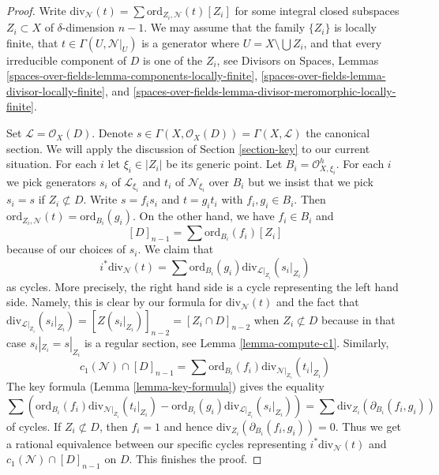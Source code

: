 \begin{proof}
Write $\text{div}_\mathcal{N}(t) = \sum \text{ord}_{Z_i, \mathcal{N}}(t)[Z_i]$
for some integral closed subspaces $Z_i \subset X$ of $\delta$-dimension
$n - 1$. We may assume that the family $\{Z_i\}$ is locally
finite, that $t \in \Gamma(U, \mathcal{N}|_U)$ is a generator
where $U = X \setminus \bigcup Z_i$, and that every irreducible component
of $D$ is one of the $Z_i$, see
Divisors on Spaces, Lemmas
\ref{spaces-over-fields-lemma-components-locally-finite},
\ref{spaces-over-fields-lemma-divisor-locally-finite}, and
\ref{spaces-over-fields-lemma-divisor-meromorphic-locally-finite}.

\medskip\noindent
Set $\mathcal{L} = \mathcal{O}_X(D)$. Denote
$s \in \Gamma(X, \mathcal{O}_X(D)) = \Gamma(X, \mathcal{L})$
the canonical section. We will apply the discussion of
Section \ref{section-key} to our current situation.
For each $i$ let $\xi_i \in |Z_i|$ be its generic point. Let
$B_i = \mathcal{O}_{X, \xi_i}^h$. For each $i$ we pick generators
$s_i$ of $\mathcal{L}_{\xi_i}$ and $t_i$ of $\mathcal{N}_{\xi_i}$
over $B_i$ but we insist that we pick $s_i = s$ if $Z_i \not \subset D$.
Write $s = f_i s_i$ and $t = g_i t_i$ with $f_i, g_i \in B_i$.
Then $\text{ord}_{Z_i, \mathcal{N}}(t) = \text{ord}_{B_i}(g_i)$.
On the other hand, we have $f_i \in B_i$ and
$$
[D]_{n - 1} = \sum \text{ord}_{B_i}(f_i)[Z_i]
$$
because of our choices of $s_i$. We claim that
$$
i^*\text{div}_\mathcal{N}(t) =
\sum \text{ord}_{B_i}(g_i) \text{div}_{\mathcal{L}|_{Z_i}}(s_i|_{Z_i})
$$
as cycles. More precisely, the right hand side is a cycle
representing the left hand side. Namely, this is clear by our
formula for $\text{div}_\mathcal{N}(t)$ and the fact that
$\text{div}_{\mathcal{L}|_{Z_i}}(s_i|_{Z_i}) = [Z(s_i|_{Z_i})]_{n - 2} =
[Z_i \cap D]_{n - 2}$ when $Z_i \not \subset D$ because in
that case $s_i|_{Z_i} = s|_{Z_i}$ is a regular section, see
Lemma \ref{lemma-compute-c1}. Similarly,
$$
c_1(\mathcal{N}) \cap [D]_{n - 1} =
\sum \text{ord}_{B_i}(f_i) \text{div}_{\mathcal{N}|_{Z_i}}(t_i|_{Z_i})
$$
The key formula (Lemma \ref{lemma-key-formula}) gives the equality
$$
\sum \left(
\text{ord}_{B_i}(f_i) \text{div}_{\mathcal{N}|_{Z_i}}(t_i|_{Z_i}) -
\text{ord}_{B_i}(g_i) \text{div}_{\mathcal{L}|_{Z_i}}(s_i|_{Z_i}) \right) =
\sum \text{div}_{Z_i}(\partial_{B_i}(f_i, g_i))
$$
of cycles. If $Z_i \not \subset D$, then $f_i = 1$ and hence
$\text{div}_{Z_i}(\partial_{B_i}(f_i, g_i)) = 0$. Thus we get a rational
equivalence between our specific cycles representing
$i^*\text{div}_\mathcal{N}(t)$ and $c_1(\mathcal{N}) \cap [D]_{n - 1}$
on $D$. This finishes the proof.
\end{proof}

